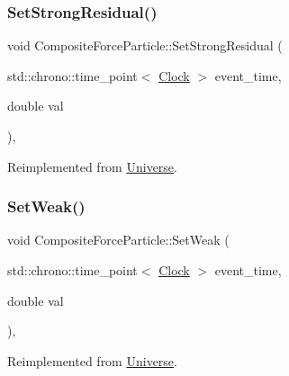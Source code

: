 \subsubsection{\texorpdfstring{Set\+Strong\+Residual()}{SetStrongResidual()}}
{\footnotesize\ttfamily void Composite\+Force\+Particle\+::\+Set\+Strong\+Residual (\begin{DoxyParamCaption}\item[{std\+::chrono\+::time\+\_\+point$<$ \mbox{\hyperlink{universe_8h_a0ef8d951d1ca5ab3cfaf7ab4c7a6fd80}{Clock}} $>$}]{event\+\_\+time,  }\item[{double}]{val }\end{DoxyParamCaption})\hspace{0.3cm}{\ttfamily [inline]}, {\ttfamily [virtual]}}



Reimplemented from \mbox{\hyperlink{classUniverse_a1b2d6197ddf3d613cc30bd04d22ed8b7}{Universe}}.

\mbox{\label{classCompositeForceParticle_a7899a6efda98b062051e37c25c214e2a}} 
\subsubsection{\texorpdfstring{Set\+Weak()}{SetWeak()}}
{\footnotesize\ttfamily void Composite\+Force\+Particle\+::\+Set\+Weak (\begin{DoxyParamCaption}\item[{std\+::chrono\+::time\+\_\+point$<$ \mbox{\hyperlink{universe_8h_a0ef8d951d1ca5ab3cfaf7ab4c7a6fd80}{Clock}} $>$}]{event\+\_\+time,  }\item[{double}]{val }\end{DoxyParamCaption})\hspace{0.3cm}{\ttfamily [inline]}, {\ttfamily [virtual]}}



Reimplemented from \mbox{\hyperlink{classUniverse_a0f5cd04081b41ee931c0557dc397f6fb}{Universe}}.

\mbox{\label{classCompositeForceParticle_a73a3792ae1c334e74f945fea56083f0b}} 
